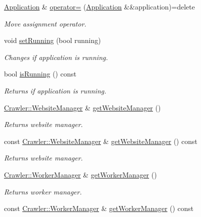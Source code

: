\begin{DoxyCompactItemize}
\hyperlink{class_crawler_1_1_application}{Application} \& \hyperlink{class_crawler_1_1_application_a31d508ac368f000bd3f4dd6626569279}{operator=} (\hyperlink{class_crawler_1_1_application}{Application} \&\&application)=delete
\begin{DoxyCompactList}\small\item\em Move assignment operator. \end{DoxyCompactList}\item 
void \hyperlink{class_crawler_1_1_application_aec89860e70e9f040f5468fc233144cae}{set\+Running} (bool running)
\begin{DoxyCompactList}\small\item\em Changes if application is running. \end{DoxyCompactList}\item 
bool \hyperlink{class_crawler_1_1_application_a09ab3c80a3677f69b6ba6f6a81367ce6}{is\+Running} () const 
\begin{DoxyCompactList}\small\item\em Returns if application is running. \end{DoxyCompactList}\item 
\hyperlink{class_crawler_1_1_website_manager}{Crawler\+::\+Website\+Manager} \& \hyperlink{class_crawler_1_1_application_acff7506553bf1a55dced63c1d0b1c2e4}{get\+Website\+Manager} ()
\begin{DoxyCompactList}\small\item\em Returns website manager. \end{DoxyCompactList}\item 
const \hyperlink{class_crawler_1_1_website_manager}{Crawler\+::\+Website\+Manager} \& \hyperlink{class_crawler_1_1_application_a08d275f1722533ab7ea40b276b3ee712}{get\+Website\+Manager} () const 
\begin{DoxyCompactList}\small\item\em Returns website manager. \end{DoxyCompactList}\item 
\hyperlink{class_crawler_1_1_worker_manager}{Crawler\+::\+Worker\+Manager} \& \hyperlink{class_crawler_1_1_application_aae5500b115428bbe7de9c0451fd3b556}{get\+Worker\+Manager} ()
\begin{DoxyCompactList}\small\item\em Returns worker manager. \end{DoxyCompactList}\item 
const \hyperlink{class_crawler_1_1_worker_manager}{Crawler\+::\+Worker\+Manager} \& \hyperlink{class_crawler_1_1_application_adb00513d242574057f14d71b60e152bf}{get\+Worker\+Manager} () const 

\end{DoxyCompactItemize}
